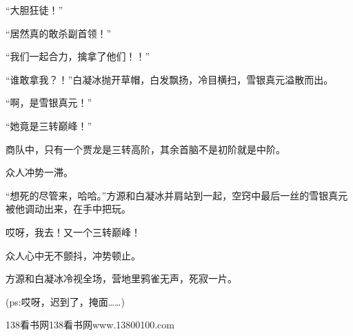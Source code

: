 \begin{this_body}
“大胆狂徒！”

“居然真的敢杀副首领！”

“我们一起合力，擒拿了他们！！”

“谁敢拿我？！”白凝冰抛开草帽，白发飘扬，冷目横扫，雪银真元溢散而出。

“啊，是雪银真元！”

“她竟是三转巅峰！”

商队中，只有一个贾龙是三转高阶，其余首脑不是初阶就是中阶。

众人冲势一滞。

“想死的尽管来，哈哈。”方源和白凝冰并肩站到一起，空窍中最后一丝的雪银真元被他调动出来，在手中把玩。

哎呀，我去！又一个三转巅峰！

众人心中无不颤抖，冲势顿止。

方源和白凝冰冷视全场，营地里鸦雀无声，死寂一片。

(ps:哎呀，迟到了，掩面……)

138看书网138看书网www.13800100.com

\end{this_body}


